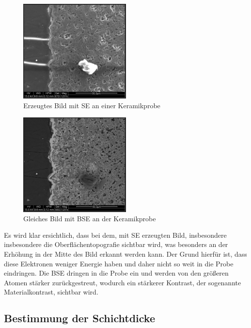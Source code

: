 \documentclass[12pt,english,ngerman]{scrartcl}
\begin{document}
\begin{figure}[H]
	\begin{center}
		\includegraphics[width =0.5\textwidth]{./figures/se.png}
	\end{center}
	\caption{Erzeugtes Bild mit SE an einer Keramikprobe}
    \label{fig:se}
\end{figure}

\begin{figure}[H]
	\begin{center}
		\includegraphics[width =0.5\textwidth]{./figures/bse.png}
	\end{center}
	\caption{Gleiches Bild mit BSE an der Keramikprobe}
    \label{fig:bse}
\end{figure}

Es wird klar ersichtlich, dass bei dem, mit SE erzeugten Bild, insbesondere insbesondere die Oberflächentopografie sichtbar
wird, was besonders an der Erhöhung in der Mitte des Bild erkannt werden kann. Der Grund hierfür ist, dass diese Elektronen
weniger Energie haben und daher nicht so weit in die Probe eindringen. Die BSE dringen in die Probe ein und werden von den 
größeren Atomen stärker zurückgestreut, wodurch ein stärkerer Kontrast, der sogenannte Materialkontrast, sichtbar wird.


\subsection{Bestimmung der Schichtdicke}
\end{document}
